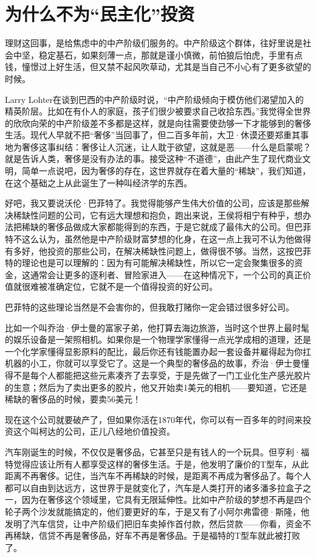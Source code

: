 \section{为什么不为``民主化''投资}

理财这回事，是给焦虑中的中产阶级们服务的。中产阶级这个群体，往好里说是社会中坚，稳定基石，如果刻薄一点，那就是谨小慎微，前怕狼后怕虎，手里有点钱，憧憬过上好生活，但又禁不起风吹草动，尤其是当自己不小心有了更多欲望的时候。

Larry
Lohter在谈到巴西的中产阶级时说，``中产阶级倾向于模仿他们渴望加入的精英阶层。比如在有仆人的家庭，孩子们很少被要求自己收拾东西。''我觉得全世界的欣欣向荣的中产阶级差不多都是这样，就是向往需要使劲够一下才能够到的奢侈生活。现代人早就不把``奢侈''当回事了，但二百多年前，大卫·休谟还要郑重其事地为奢侈这事纠结：奢侈让人沉迷，让人耽于欲望，这就是恶------什么是启蒙呢？就是告诉人类，奢侈是没有办法的事。接受这种``不道德''，由此产生了现代商业文明，简单一点说吧，因为奢侈的存在，这世界就存在着大量的``稀缺''，我们知道，在这个基础之上从此诞生了一种叫经济学的东西。

好吧，我又要说沃伦·巴菲特了。我觉得能够产生伟大价值的公司，应该是那些解决稀缺性问题的公司，它有远大理想和抱负，跑出来说，王侯将相宁有种乎，想办法把稀缺的奢侈品做成大家都能得到的东西，于是它就成了最伟大的公司。但巴菲特不这么认为，虽然他是中产阶级财富梦想的化身，在这一点上我可不认为他做得有多好，他投资的那些公司，在解决稀缺性问题上，做得很不够。当然，这按巴菲特的理论也是可以理解的：因为有可能解决稀缺性，所以它一定会聚集很多的资金，这通常会让更多的逐利者、冒险家进入------在这种情况下，一个公司的真正价值就很难被准确定位，它就不是一个值得投资的好公司。

巴菲特的这些理论当然是不会害你的，但我敢打赌你一定会错过很多好公司。

比如一个叫乔治·伊士曼的富家子弟，他打算去海边旅游，当时这个世界上最时髦的娱乐设备是一架照相机。如果你是一个物理学家懂得一点光学成相的道理，还是一个化学家懂得显影原料的配比，最后你还有钱能置办起一套设备并雇得起为你扛机器的小工，你就可以享受它了。这是一个典型的奢侈品的故事，乔治·伊士曼懂得不是每个人都能把这些元素凑齐了去享受，于是先做了一门工业化生产感光胶片的生意；然后为了卖出更多的胶片，他又开始卖1美元的相机------要知道，它还是稀缺的奢侈品的时候，要卖56美元！

现在这个公司就要破产了，但如果你活在1870年代，你可以有一百多年的时间来投资这个叫柯达的公司，正儿八经地价值投资。

汽车刚诞生的时候，不仅仅是奢侈品，它甚至只是有钱人的一个玩具。但亨利·福特觉得应该让所有人都享受这样的奢侈生活。于是，他发明了廉价的T型车，从此距离不再奢侈。记住，当汽车不再稀缺的时候，是距离不再成为奢侈品了。每个人都可以自由到达远方，这世界于是就变化了，汽车是人类打开的诸多潘多拉盒子之一，因为在奢侈这个领域里，它具有无限延伸性。比如中产阶级的梦想不再是四个轮子两个沙发就能搞定的，他们要更好的车，于是又有了小阿尔弗雷德·斯隆，他发明了汽车信贷，让中产阶级们把旧车卖掉作首付款，然后贷款------你看，资金不再稀缺，信贷不再是奢侈品，好车不再是奢侈品。于是福特的T型车就此被打败了。

